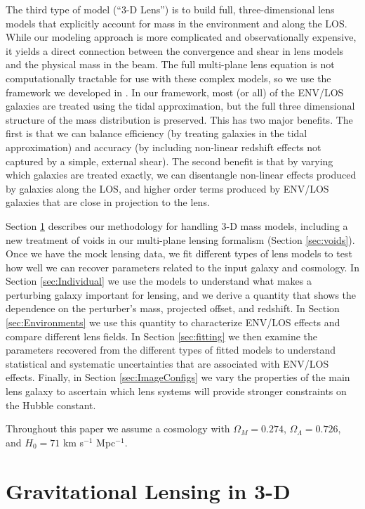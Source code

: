 \documentclass{emulateapj}
\begin{document}
The third type of model (``3-D Lens'') is to build full, three-dimensional lens models that explicitly account for mass in the environment and along the LOS. While our modeling approach is more complicated and observationally expensive, it yields a direct connection between the convergence and shear in lens models and the physical mass in the beam. The full multi-plane lens equation is not computationally tractable for use with these complex models, so we use the framework we developed in \citet[hereafter M14]{McCully14}. In our framework, most (or all) of the ENV/LOS galaxies are treated using the tidal approximation, but the full three dimensional structure of the mass distribution is preserved. This has two major benefits. The first is that we can balance efficiency (by treating galaxies in the tidal approximation) and accuracy (by including non-linear redshift effects not captured by a simple, external shear). The second benefit is that by varying which galaxies are treated exactly, we can disentangle non-linear effects produced by galaxies along the LOS, and higher order terms produced by ENV/LOS galaxies that are close in projection to the lens.

 Section \ref{sec:3DMassModels} describes our methodology for handling 3-D mass models, including a new treatment of voids in our multi-plane lensing formalism (Section \ref{sec:voids}). Once we have the mock lensing data, we fit different types of lens models to test how well we can recover parameters related to the input galaxy and cosmology.  In Section \ref{sec:Individual} we use the models to understand what makes a perturbing galaxy important for lensing, and we derive a quantity that shows the dependence on the perturber's mass, projected offset, and redshift. In Section \ref{sec:Environments} we use this quantity to characterize ENV/LOS effects and compare different lens fields. In Section \ref{sec:fitting} we then examine the parameters recovered from the different types of fitted models to understand statistical and systematic uncertainties that are associated with ENV/LOS effects. Finally, in Section \ref{sec:ImageConfigs} we vary the properties of the main lens galaxy to ascertain which lens systems will provide stronger constraints on the Hubble constant.

Throughout this paper we assume a cosmology with $\Omega_M = 0.274$, $\Omega_\Lambda = 0.726$, and $H_0 = 71$ km s$^{-1}$ Mpc$^{-1}$.


\section{Gravitational Lensing in 3-D}
\label{sec:3DMassModels}
\end{document}
